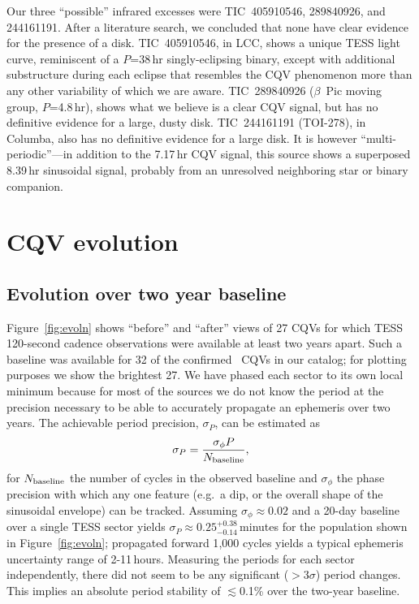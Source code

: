 \documentclass[11pt,twocolumn,tighten]{aastex63}
\begin{document}
Our three ``possible'' infrared excesses were TIC~405910546,
289840926, and 244161191.  After a literature search, we concluded
that none have clear evidence for the presence of a disk.
TIC~405910546, in LCC, shows a unique TESS light curve, reminiscent of
a $P$=38\,hr singly-eclipsing binary, except with additional
substructure during each eclipse that resembles the CQV phenomenon
more than any other variability of which we are aware.  TIC~289840926
($\beta$~Pic moving group, $P$=4.8\,hr), shows what we believe is a
clear CQV signal, but has no definitive evidence for a large, dusty
disk.  TIC~244161191 (TOI-278), in Columba, also has no definitive
evidence for a large disk.  It is however ``multi-periodic''---in
addition to the 7.17\,hr CQV signal, this source shows a superposed
8.39\,hr sinusoidal signal, probably from an unresolved neighboring
star or binary companion.


\section{CQV evolution}
\label{sec:evoln}

\subsection{Evolution over two year baseline}

Figure~\ref{fig:evoln} shows ``before'' and ``after'' views of 27 CQVs
for which TESS 120-second cadence observations were available at least
two years apart.  Such a baseline was available for 32 of the
confirmed \ngoods\ CQVs in our catalog; for plotting purposes we show
the brightest 27.  We have phased each sector to its own local minimum
because for most of the sources we do not know the period at the
precision necessary to be able to accurately propagate an ephemeris
over two years.  The achievable period precision, $\sigma_P$, can be
estimated as
\begin{equation}
  \sigma_{P} = \frac { \sigma_{\phi} P } { N_{\rm baseline} },
  \label{eq:periodprecision}
\end{equation}
for $N_{\rm baseline}$ the number of cycles in the observed baseline
and $\sigma_{\phi}$ the phase precision with which any one feature
(e.g.~a dip, or the overall shape of the sinusoidal envelope) can be
tracked.  Assuming $\sigma_\phi$$\approx$$0.02$ and a 20-day baseline
over a single TESS sector yields
$\sigma_{P}$$\approx$$0.25^{+0.38}_{-0.14}$\,minutes for the
population shown in Figure~\ref{fig:evoln}; propagated forward 1{,}000
cycles yields a typical ephemeris uncertainty range of 2-11\,hours.
Measuring the periods for each sector independently, there did not
seem to be any significant ($>$3$\sigma$) period changes.  This
implies an absolute period stability of $\lesssim$0.1\% over the
two-year baseline.
\end{document}
